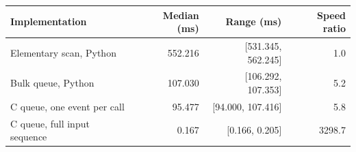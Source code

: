 \begin{tabular}{@{}lrrr@{}}
\toprule
Implementation & Median (ms) & Range (ms) & Speed ratio \\
\midrule
Elementary scan, Python & 552.216 & [531.345, 562.245] & 1.0 \\
Bulk queue, Python & 107.030 & [106.292, 107.353] & 5.2 \\
C queue, one event per call & 95.477 & [94.000, 107.416] & 5.8 \\
C queue, full input sequence & 0.167 & [0.166, 0.205] & 3298.7 \\
\bottomrule
\end{tabular}
